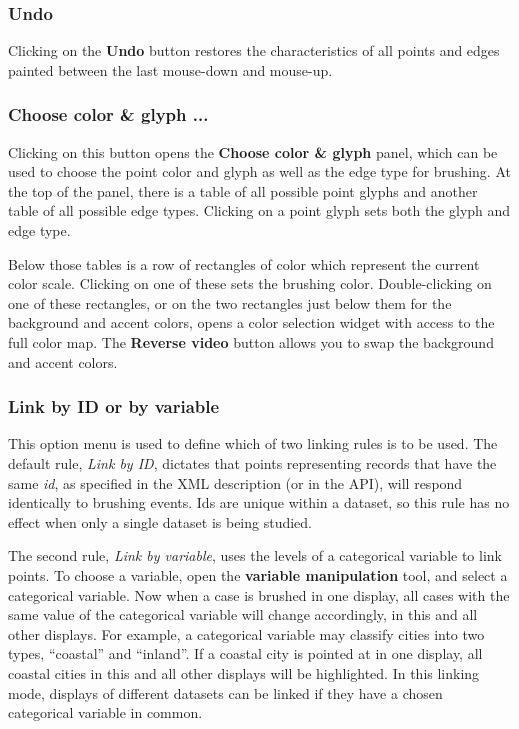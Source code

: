\documentclass[11pt]{article}
\begin{document}
\subsubsection{Undo}
%
Clicking on the {\bf Undo} button restores the characteristics
of all points and edges painted between the last mouse-down and
mouse-up.

\subsubsection{Choose color \& glyph ...}

Clicking on this button opens the {\bf Choose color \& glyph} panel,
which can be used to choose the point color and glyph as well as the
edge type for brushing.  At the top of the panel, there is a table of
all possible point glyphs and another table of all possible edge types.
Clicking on a point glyph sets both the glyph and edge type.

Below those tables is a row of rectangles of color which represent the
current color scale.  Clicking on one of these sets the brushing color.
Double-clicking on one of these rectangles, or on the two rectangles
just below them for the background and accent colors, opens a color
selection widget with access to the full color map.  The {\bf Reverse
video} button allows you to swap the background and accent colors.

\subsubsection{Link by ID or by variable}
\label{LinkingRules}

This option menu is used to define which of two linking rules is to
be used.  The default rule, {\it Link by ID}, dictates that points
representing records that have the same {\it id}, as specified in the XML
description (or in the API), will respond identically to brushing events.
Ids are unique within a dataset, so this rule has no effect when only
a single dataset is being studied.

The second rule, {\it Link by variable}, uses the levels of a categorical
variable to link points.  To choose a variable, open the {\bf variable
manipulation} tool, and select a categorical variable.  Now when a
case is brushed in one display, all cases with the same value of the
categorical variable will change accordingly, in this and all other
displays.  For example, a categorical variable may classify cities into
two types, ``coastal'' and ``inland''.  If a coastal city is pointed at
in one display, all coastal cities in this and all other displays will
be highlighted.  In this linking mode, displays of different datasets
can be linked if they have a chosen categorical variable in common.
\end{document}
